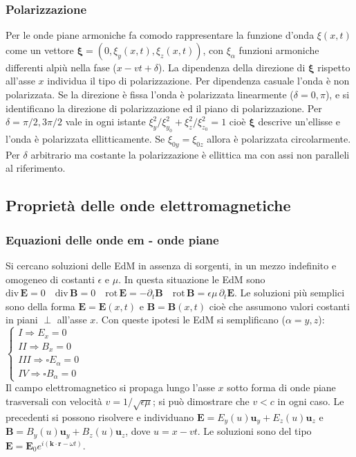 \documentclass[11pt,a4paper]{article}
\newcommand{\dive}[1]{\text{div}\,#1}
\newcommand{\rot}[1]{\text{rot}\,#1}
\begin{document}
\subsubsection{Polarizzazione}
Per le onde piane armoniche fa comodo rappresentare la funzione d'onda $\xi(x,t)$ come un vettore $\bm \xi = (0, \xi_y(x,t), \xi_z(x,t))$, con $\xi_\alpha$ funzioni armoniche differenti alpiù nella fase ($x-vt+\delta$). La dipendenza della direzione di $\bm \xi$ rispetto all'asse $x$ individua il tipo di polarizzazione. Per dipendenza casuale l'onda è non polarizzata. Se la direzione è fissa l'onda è polarizzata linearmente ($\delta = 0,\pi$), e si identificano la direzione di polarizzazione ed il piano di polarizzazione. Per $\delta =\pi/2,3\pi/2$ vale in ogni istante $\xi_y^2/\xi_{y_0}^2 + \xi_z^2/\xi_{z_0}^2 = 1$ cioè $\bm \xi$ descrive un'ellisse e l'onda è polarizzata ellitticamente. Se $\xi_{0y} = \xi_{0z}$ allora è polarizzata circolarmente. Per $\delta$ arbitrario ma costante la polarizzazione è ellittica ma con assi non paralleli al riferimento.

\subsection{Proprietà delle onde elettromagnetiche}
\subsubsection{Equazioni delle onde em - onde piane}
Si cercano soluzioni delle EdM in assenza di sorgenti, in un mezzo indefinito e omogeneo di costanti $\epsilon$ e $\mu$. In questa situazione le EdM sono $\dive\mathbf E = 0 \quad \dive\mathbf B = 0 \quad \rot\mathbf E = -\partial_t \mathbf B \quad \rot\mathbf B = \epsilon\mu \, \partial_t \mathbf E$. Le soluzioni più semplici sono della forma $\mathbf E = \mathbf E(x,t)$ e $\mathbf B = \mathbf B(x,t)$ cioè che assumono valori costanti in piani $\perp$ all'asse $x$. Con queste ipotesi le EdM si semplificano ($\alpha = y,z$):\\
$\begin{cases} I \Rightarrow E_x = 0\\
II \Rightarrow B_x = 0\\
III \Rightarrow \square E_\alpha = 0\\
IV \Rightarrow \square B_\alpha = 0 \end{cases}$\\
Il campo elettromagnetico si propaga lungo l'asse $x$ sotto forma di onde piane trasversali con velocità $v = 1/\sqrt{\epsilon\mu}$; si può dimostrare che $v < c$ in ogni caso. Le precedenti si possono risolvere e individuano $\mathbf E = E_y(u) \mathbf u_y + E_z(u) \mathbf u_z$ e $\mathbf B = B_y(u) \mathbf u_y + B_z(u) \mathbf u_z$, dove $u = x-vt$. Le soluzioni sono del tipo $\mathbf E = \mathbf E_0 e^{i(\mathbf k \cdot \mathbf r - \omega t)}$.
\end{document}
